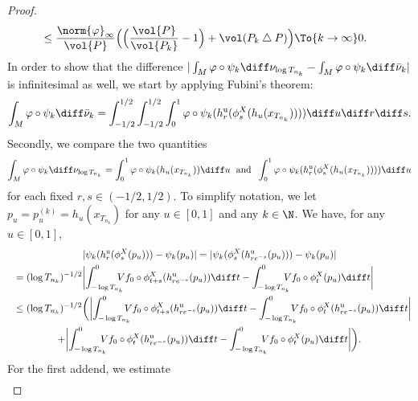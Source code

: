 \begin{appendix}
\begin{proof}
\begin{align*}
&\leq \frac{\norm{\varphi}_{\infty}}{\vol{P}}\Bigl(\Bigl(\frac{\vol{P}}{\vol{P_k}}-1\Bigr)+\vol(P_k\bigtriangleup P)\Bigr)\To{k\to\infty} 0.
\end{align*}
In order to show that the difference $|\int_{M}\varphi\circ \psi_k\diff\nu_{\log{T_{n_k}}}-\int_{M}\varphi\circ \psi_k\diff\bar{\nu}_k |$ is infinitesimal as well, we start by applying Fubini's theorem:
\begin{equation}
\label{Fubini}
\int_{M}\varphi\circ \psi_k\diff\bar{\nu}_k=\int_{-1/2}^{1/2}\int_{-1/2}^{1/2}\int_{0}^{1}\varphi\circ\psi_k(h^{\mathrm{u}}_r(\phi^{X}_{s}(h_u(x_{T_{n_k}}))))\diff u\diff r\diff s.
\end{equation}
Secondly, we compare the two quantities
\begin{equation*}
\int_{M}\varphi\circ \psi_k\diff\nu_{\log{T_{n_k}}}=\int_{0}^{1}\varphi\circ\psi_k(h_{u}(x_{T_{n_k}}))\diff u\; \text{ and }\;\int_{0}^{1}\varphi\circ\psi_k(h^{\mathrm{u}}_r(\phi^{X}_{s}(h_u(x_{T_{n_k}}))))\diff u
\end{equation*}
for each fixed $r,s\in (-1/2,1/2)$. To simplify notation, we let $p_u=p_u^{(k)}=h_u(x_{T_{n_k}})$ for any $u\in [0,1]$ and any $k\in \N$. We have, for any $u\in [0,1]$,
\begin{multline*}
|\psi_k(h^{\mathrm{u}}_r(\phi^{X}_s(p_u)))-\psi_k(p_u)|=|\psi_k(\phi^{X}_s(h^{\mathrm{u}}_{re^{-s}}(p_u)))-\psi_k(p_u)|\\
\shoveleft{=(\log{T_{n_k}})^{-1/2}\biggl|\int_{-\log{T_{n_k}}}^{0}\hspace*{-3mm}Vf_0\circ \phi^{X}_{t+s}(h^{\mathrm{u}}_{re^{-s}}(p_u))\diff t-\int_{-\log{T_{n_k}}}^{0}\hspace*{-3mm}Vf_0\circ \phi_t^{X}(p_u)\diff t\biggr|}\\
\shoveleft{\leq (\log{T_{n_k}})^{-1/2}\bigg(\biggl|\int_{-\log{T_{n_k}}}^{0}\hspace*{-3mm}Vf_0\circ \phi^{X}_{t+s}(h^{\mathrm{u}}_{re^{-s}}(p_u))\diff t
-\int_{-\log{T_{n_k}}}^{0}\hspace*{-3mm}Vf_0\circ \phi^{X}_{t}(h^{\mathrm{u}}_{re^{-s}}(p_u))\diff t\biggr|}\\
+\biggl|\int_{-\log{T_{n_k}}}^{0}\hspace*{-3mm}Vf_0\circ \phi^{X}_{t}(h^{\mathrm{u}}_{re^{-s}}(p_u))\diff t-\int_{-\log{T_{n_k}}}^{0}\hspace*{-3mm}Vf_0\circ \phi_t^{X}(p_u)\diff t\biggr|\bigg).
\end{multline*}
For the first addend, we estimate
\begin{align*}

\end{align*}
\end{proof}
\end{appendix}

